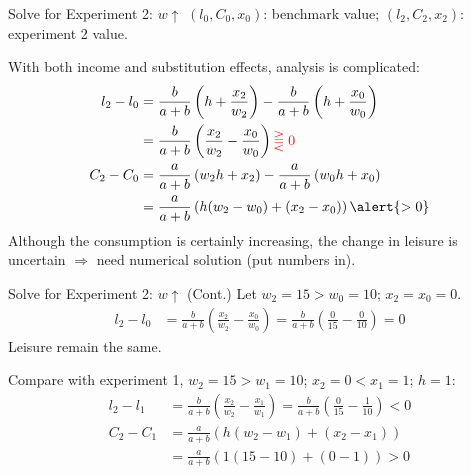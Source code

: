 \documentclass[11pt,aspectratio=43]{beamer}
\newcommand{\red}[1]{\textcolor{red}{#1}}
\theoremstyle{definition}
\begin{document}
\begin{frame}{Solve for Experiment 2: $ w \uparrow $}
\label{slide:Solve_for_Experiment_2____w__uparrow__}
$ (l_{0}, C_{0}, x_{0} )$: benchmark value;
$ (l_{2}, C_{2}, x_{2} )$: experiment 2 value.

With both income and substitution effects, analysis is complicated:
%
\begin{align}
    l_{2} - l_{0}
        & = \frac{b}{a+b} \left( h + \frac{x_{2}}{w_{2}} \right)
          - \frac{b}{a+b} \left( h + \frac{x_{0}}{w_{0}} \right)
    \\
        & = \frac{b}{a+b} \left( \frac{x_{2}}{w_{2}} - \frac{x_{0}}{w_{0}} \right) \red{ \gtreqqless 0}
    \\
    C_{2} - C_{0}
        & = \frac{a}{a+b} \left( w_{2}h + x_{2} \right)
          - \frac{a}{a+b} \left( w_{0}h + x_{0} \right)
    \\
        & = \frac{a}{a+b} \left(
            h( w_{2} - w_{0} ) + ( x_{2} - x_{0} )
        \right) \alert{> 0}
\end{align}
%
Although the consumption is certainly increasing, \alert{the change in leisure is uncertain} $ \Rightarrow  $ need \alert{numerical solution} (put numbers in).

\end{frame}

\begin{frame}{Solve for Experiment 2: $ w \uparrow $ (Cont.)}
\label{slide:Solve_for_Experiment_2____w__uparrow____Cont__}
    Let $ w_{2} = 15 > w_{0} = 10 $; $ x_{2} = x_{0} = 0 $.
    \begin{align}
        l_{2} - l_{0}
            & = \frac{b}{a+b} \left( \frac{x_{2}}{w_{2}} - \frac{x_{0}}{w_{0}} \right)
                = \frac{b}{a+b} \left( \frac{0}{15} - \frac{0}{10} \right) = 0
    \end{align}
    Leisure remain the same.

    Compare with experiment 1, $ w_{2} = 15 > w_{1} = 10 $; $ x_{2} = 0 < x_{1} = 1$; $ h = 1 $:
    \begin{align}
        l_{2} - l_{1}
            & = \frac{b}{a+b} \left( \frac{x_{2}}{w_{2}} - \frac{x_{1}}{w_{1}} \right) = \frac{b}{a+b} \left( \frac{0}{15} - \frac{1}{10} \right) < 0
        \\
        C_{2} - C_{1}
            & = \frac{a}{a+b} \left( h( w_{2} - w_{1} ) + ( x_{2} - x_{1} ) \right)
        \\
            & = \frac{a}{a+b} ( 1 ( 15 - 10 ) + (0 - 1) ) > 0
    \end{align}

\end{frame}
\end{document}
